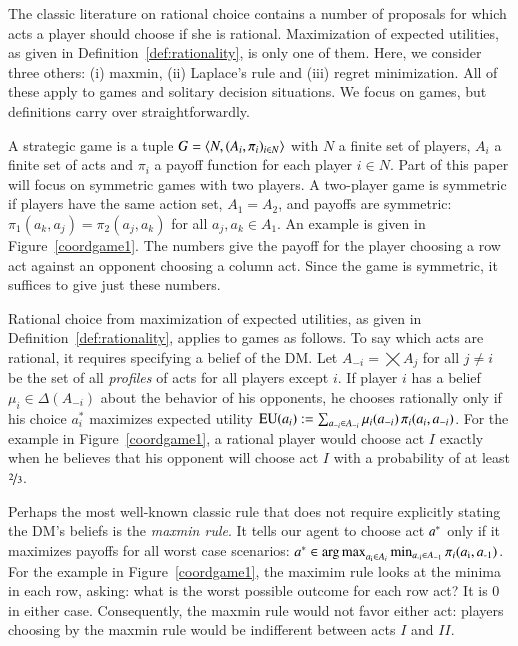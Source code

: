 \documentclass[fleqn,reqno,11pt]{article}
\begin{document}
The classic literature on rational choice contains a number of proposals for which acts a
player should choose if she is rational. Maximization of expected utilities, as
given in Definition~\ref{def:rationality}, is only one of them. Here, we consider three others:
(i) maxmin, (ii) Laplace's rule and (iii) regret minimization. All of these apply to games and
solitary decision situations. We focus on games, but definitions carry over straightforwardly.

A strategic game is a tuple $ G=\left \langle  N, (A_i , \pi_i)_{i \in N} \right\rangle$ with $N$ a finite set of
players, $A_i$ a finite set of acts and $\pi_i$ a payoff function for each player $i \in N$.
Part of this paper will focus on symmetric games with two players. A two-player game is
symmetric if players have the same action set, $A_1 = A_2$, and payoffs are symmetric:
$\pi_1(a_k, a_j) = \pi_2(a_j, a_k)$ for all $a_j,a_k \in A_1$. An example is given in
Figure~\ref{coordgame1}. The numbers give the payoff for the player choosing a row act against
an opponent choosing a column act. Since the game is symmetric, it suffices to give just these
numbers.

Rational choice from maximization of expected utilities, as given in
Definition~\ref{def:rationality}, applies to games as follows. To say which acts are rational,
it requires specifying a belief of the DM. Let $A_{-i} = \bigtimes A_j$ for all $j \neq i$ be
the set of all \emph{profiles} of acts for all players except $i$. If player $i$ has a belief
$\mu_i \in \Delta(A_{-i})$ about the behavior of his opponents, he chooses rationally only if
his choice $a^*_i$ maximizes expected utility
$\operatorname{EU}(a_i) := \sum_{a_{-i} \in A_{-i}} \mu_i(a_{-i}) \thinspace \pi_i(a_i, a_{-i})$. For
the example in Figure~\ref{coordgame1}, a rational player would choose act $I$ exactly when he
believes that his opponent will choose act $I$ with a probability of at least
$\nicefrac{2}{3}$.

Perhaps the most well-known classic rule that does not require explicitly stating the DM's
beliefs is the \emph{maxmin rule}. It tells our agent to choose act $a^*$ only if it
maximizes payoffs for all worst case scenarios:
$a^* \in \operatorname*{arg\,max}_{a_{\text{i}} \in A_i} \min_{a_{\text{-i}} \in A_{-1}} \pi_i(a_{\text{i}},
a_{\text{-1}})$.
For the example in Figure~\ref{coordgame1}, the maximim rule looks at the minima in each row,
asking: what is the worst possible outcome for each row act? It is $0$ in either
case. Consequently, the maxmin rule would not favor either act: players choosing by the maxmin
rule would be indifferent between acts $I$ and $II$.
\end{document}
